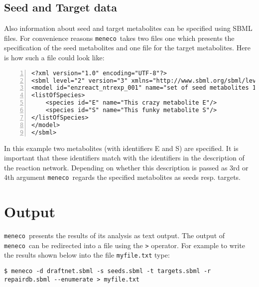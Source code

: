 \documentclass{article}
\newcommand\meneco{\texttt{meneco}}
\begin{document}
\subsection{Seed and Target data}
Also information about seed and target metabolites can be specified using SBML files.
For convenience reasons \meneco\ takes two files one which presents the specification of the seed metabolites and one file for the target metabolites.
Here is how such a file could look like:
\begin{Verbatim}[frame=single,numbers=left]
<?xml version="1.0" encoding="UTF-8"?>
<sbml level="2" version="3" xmlns="http://www.sbml.org/sbml/level2/version3">
<model id="enzreact_ntrexp_001" name="set of seed metabolites 1">
<listOfSpecies>
	<species id="E" name="This crazy metabolite E"/>
	<species id="S" name="This funky metabolite S"/>
</listOfSpecies>
</model>
</sbml>
\end{Verbatim}
In this example two metabolites (with identifiers E and S) are specified.
It is important that these identifiers match with the identifiers in the description of the reaction network.
Depending on whether this description is passed as 3rd or 4th argument \meneco\ regards the specified metabolites as seeds resp. targets.



\section{Output}

\meneco\ presents the results of its analysis as text output.
The output of \meneco\ can be redirected into a file using the \texttt{>} operator.
For example to write the results shown below into the file \texttt{myfile.txt} type:

\begin{Verbatim}[frame=single]
$ meneco -d draftnet.sbml -s seeds.sbml -t targets.sbml -r repairdb.sbml --enumerate > myfile.txt
\end{Verbatim}
\end{document}

